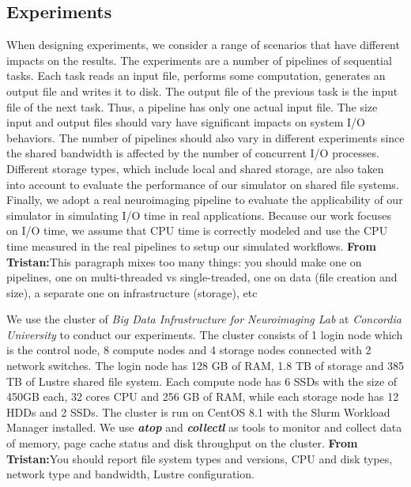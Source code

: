 \documentclass[conference]{IEEEtran}
\newcommand{\tristan}[1]{\color{orange}\textbf{From Tristan:}#1\color{black}}
\begin{document}
		\subsection{Experiments}
		
			When designing experiments, we consider a range of scenarios
			that have different impacts on the results. The experiments are
			a number of pipelines of sequential tasks. Each task reads an
			input file, performs some computation, generates an output file
			and writes it to disk. The output file of the previous task is
			the input file of the next task. Thus, a pipeline has only one
			actual input file. The size input and output files should vary
			have significant impacts on system I/O behaviors. The number of
			pipelines should also vary in different experiments since the
			shared bandwidth is affected by the number of concurrent I/O
			processes. Different storage types, which include local and
			shared storage, are also taken into account to evaluate the
			performance of our simulator on shared file systems. Finally,
			we adopt a real neuroimaging pipeline to evaluate the
			applicability of our simulator in simulating I/O time in real
			applications. Because our work focuses on I/O time, we assume
			that CPU time is correctly modeled and use the CPU time
			measured in the real pipelines to setup our simulated
			workflows. \tristan{This paragraph mixes too many things: you
			should make one on pipelines, one on multi-threaded vs
			single-treaded, one on data (file creation and size), a separate one on infrastructure (storage),
			etc}
			
			We use the cluster of \textit{Big Data Infrastructure for
			Neuroimaging Lab} at \textit{Concordia University} to conduct
			our experiments. The cluster consists of 1 login node which is
			the control node, 8 compute nodes and 4 storage nodes connected
			with 2 network switches. The login node has 128 GB of RAM, 1.8
			TB of storage and 385 TB of Lustre shared file system. Each
			compute node has 6 SSDs with the size of 450GB each, 32 cores
			CPU and 256 GB of RAM, while each storage node has 12 HDDs and
			2 SSDs. The cluster is run on CentOS 8.1 with the Slurm
			Workload Manager installed. We use \textbf{\textit{atop}} and
			\textbf{\textit{collectl}} as tools to monitor and collect data
			of memory, page cache status and disk throughput on the
			cluster. \tristan{You should report file system types and versions, CPU and disk types, network type and bandwidth, Lustre configuration.}
	
\end{document}
